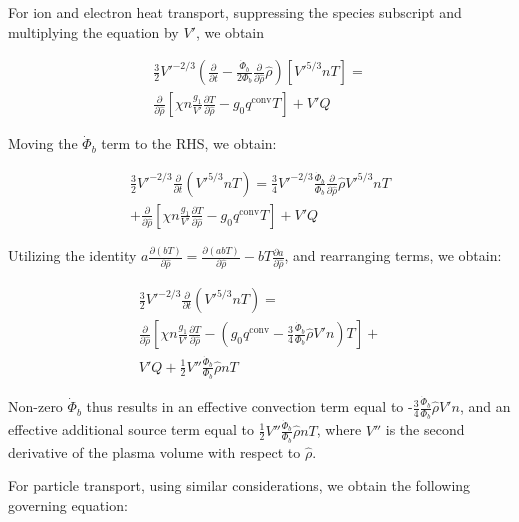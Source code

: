 \documentclass[aps, reprint, nofootinbib]{revtex4-2}
\newcommand{\rnorm}{\hat{\rho}}
\newcommand{\phibdot}{\dot{\Phi}_b}
\newcommand{\phib}{\Phi_b}
\begin{document}
\label{appendix:phibdot}

For ion and electron heat transport, suppressing the species subscript and multiplying the equation by $V'$, we obtain

\begin{multline}
\label{eq:heattransport}
\frac{3}{2} V'^{-2/3} \left(\frac{\partial }{\partial t}-\frac{\phibdot}{2\phib}\frac{\partial}{\partial\rnorm}\rnorm\right)\left[V'^{5/3} n T\right] = \\ \frac{\partial}{\partial \rnorm} \left[\chi n \frac{g_1}{V'} \frac{\partial T}{\partial \rnorm} - g_0q^{\mathrm{conv}}T\right] + V'Q
\end{multline}

Moving the $\phibdot$ term to the RHS, we obtain:

\begin{multline}
\label{eq:heattransport}
\frac{3}{2} V'^{-2/3} \frac{\partial }{\partial t}\left(V'^{5/3} n T\right) = \frac{3}{4}V'^{-2/3}\frac{\phibdot }{\phib}\frac{\partial}{\partial\rnorm}\rnorm V'^{5/3} n T \\ + \frac{\partial}{\partial \rnorm } \left[\chi n \frac{g_1}{V'} \frac{\partial T}{\partial \rnorm} - g_0q^{\mathrm{conv}}T\right] + V'Q
\end{multline}

Utilizing the identity $a \frac{\partial (b T) }{\partial \rnorm} = \frac{\partial (a b T) }{\partial \rnorm} - b T\frac{\partial a }{\partial \rnorm}$, and rearranging terms, we obtain:

\begin{multline}
\label{eq:heattransport}
\frac{3}{2} V'^{-2/3} \frac{\partial }{\partial t}\left(V'^{5/3} n T\right) = \\ \frac{\partial}{\partial \rnorm } \left[\chi n \frac{g_1}{V'} \frac{\partial T}{\partial \rnorm} - \left(g_0q^{\mathrm{conv}} - \frac{3}{4}\frac{\phibdot }{\phib}\rnorm V' n \right)T \right] + \\ V'Q + \frac{1}{2}V''\frac{\phibdot }{\phib}\rnorm n T 
\end{multline}

Non-zero $\phibdot$ thus results in an effective convection term equal to -$\frac{3}{4}\frac{\phibdot }{\phib}\rnorm V' n$, and an effective additional source term equal to $\frac{1}{2}V''\frac{\phibdot }{\phib}\rnorm n T$, where $V''$ is the second derivative of the plasma volume with respect to $\rnorm$.

For particle transport, using similar considerations, we obtain the following governing equation:
\end{document}
